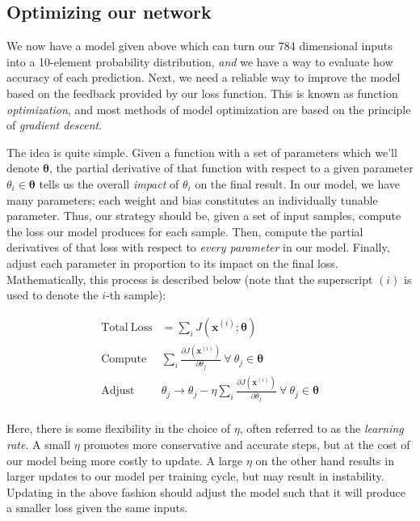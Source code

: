 \subsection{Optimizing our network}\label{optimizing-our-network}

We now have a model given above which can turn our 784 dimensional
inputs into a 10-element probability distribution, \emph{and} we have a
way to evaluate how accuracy of each prediction. Next, we need a
reliable way to improve the model based on the feedback provided by our
loss function. This is known as function \emph{optimization}, and most
methods of model optimization are based on the principle of
\emph{gradient descent}.

The idea is quite simple. Given a function with a set of parameters
which we'll denote \(\bm{\theta}\), the partial derivative of that
function with respect to a given parameter \(\theta_i \in \bm{\theta}\)
tells us the overall \emph{impact} of \(\theta_i\) on the final result.
In our model, we have many parameters; each weight and bias constitutes
an individually tunable parameter. Thus, our strategy should be, given a
set of input samples, compute the loss our model produces for each
sample. Then, compute the partial derivatives of that loss with respect
to \emph{every parameter} in our model. Finally, adjust each parameter
in proportion to its impact on the final loss. Mathematically, this
process is described below (note that the superscript \((i)\) is used to
denote the \(i\)-th sample):

\[
\begin{aligned}
	\mathrm{Total~Loss} &= \sum_i J(\mathbf{x}^{(i)}; \bm\theta) \\
	\mathrm{Compute}~ &\sum_i \frac{\partial J(\mathbf{x}^{(i)})}{\partial \theta_j} ~\forall ~\theta_j \in \bm\theta \\
	\mathrm{Adjust}~ & \theta_j \rightarrow \theta_j - \eta \sum_i \frac{\partial J(\mathbf{x}^{(i)})}{\partial \theta_j} ~\forall ~\theta_j \in\bm\theta\\
\end{aligned}
\]

Here, there is some flexibility in the choice of \(\eta\), often
referred to as the \emph{learning rate}. A small \(\eta\) promotes more
conservative and accurate steps, but at the cost of our model being more
costly to update. A large \(\eta\) on the other hand results in larger
updates to our model per training cycle, but may result in instability.
Updating in the above fashion should adjust the model such that it will
produce a smaller loss given the same inputs.

